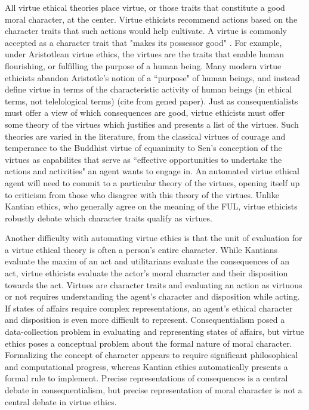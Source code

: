 \begin{isabellebody}
\begin{isamarkuptext}
All virtue ethical theories place virtue, or those traits that constitute a good moral character, 
at the center. Virtue ethicists recommend actions based on the character traits that such actions
would help cultivate. A virtue is commonly accepted as a character trait that "makes its possessor
good" \cite{vesep}. For example, under Aristotlean virtue ethics, the virtues are the traits that 
enable human flourishing, or fulfilling the purpose of a human being. Many modern virtue ethicists abandon
Aristotle's notion of a ``purpose" of human beings, and instead define virtue in terms of the characteristic
activity of human beings (in ethical terms, not telelological terms) (cite from gened paper). Just as 
consequentialists must offer a view of which consequences are good, virtue ethicists must offer some 
theory of the virtues which justifies and presents a list of the virtues. Such theories are varied in
the literature, from the classical virtues of courage and temperance to the Buddhist virtue of 
equanimity to Sen's conception of the virtues as capabilites that serve as ``effective opportunities to 
undertake the actions and activities" an agent wants to engage in. An automated virtue ethical agent 
will need to commit to a particular theory of the virtues, opening itself up to criticism from those
who disagree with this theory of the virtues. Unlike Kantian ethics, who generally agree on the meaning of
the FUL, virtue ethicists robustly debate which character traits qualify as virtues.  

Another difficulty with automating virtue ethics is that the unit of evaluation for a virtue ethical
theory is often a person's entire character. While Kantians evaluate the maxim of an act and utilitarians
evaluate the consequences of an act, virtue ethicists evaluate the actor's moral character and their 
disposition towards the act. Virtues are character traits and evaluating an action as virtuous or 
not requires understanding the agent's character and disposition while acting. If states of affairs
require complex representations, an agent's ethical character and disposition is even more difficult
to represent. Consequentialism posed a data-collection problem in evaluating and representing states
of affairs, but virtue ethics poses a conceptual problem about the formal nature of moral character.
Formalizing the concept of character appears to require significant philosophical and computational
progress, whereas Kantian ethics automatically presents a formal rule to implement. Precise representations
of consequences is a central debate in consequentialism, but precise representation of moral character
is not a central debate in virtue ethics. 


\end{isamarkuptext}
\end{isabellebody}
